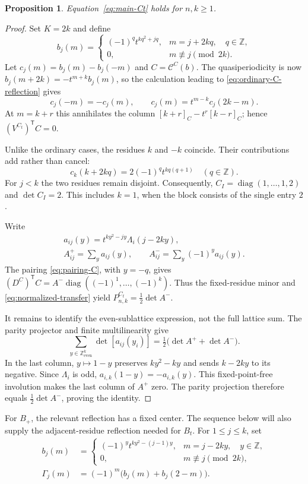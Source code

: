 \documentclass[12pt]{article}
\newtheorem{proposition}[theorem]{Proposition}
\numberwithin{equation}{section}
\newcommand{\Z}{\mathbb Z}
\newcommand{\diag}{\operatorname{diag}}
\newcommand{\latticeeven}{\Z_{\mathrm{even}}^k}
\begin{document}
\begin{proposition}
Equation~\eqref{eq:main-Ct} holds for $n,k\ge1$.
\end{proposition}

\begin{proof}
Set $K=2k$ and define
\[
 b_j(m)=
 \begin{cases}
 (-1)^q t^{kq^2+jq},&m=j+2kq,\quad q\in\Z,\\
 0,&m\not\equiv j\pmod{2k}.
 \end{cases}
\]
Let $c_j(m)=b_j(m)-b_j(-m)$ and $C=\mathcal C^C(b)$.
The quasiperiodicity is now
$b_j(m+2k)=-t^{m+k}b_j(m)$, so the calculation leading to
\eqref{eq:ordinary-C-reflection} gives
\[
 c_j(-m)=-c_j(m),\qquad
 c_j(m)=t^{m-k}c_j(2k-m).
\]
At $m=k+r$ this annihilates the column
$[k+r]_C-t^r[k-r]_C$; hence $(V^{C_t})^{\mathsf T}C=0$.

Unlike the ordinary cases, the residues $k$ and $-k$ coincide.
Their contributions add rather than cancel:
\[
 c_k(k+2kq)=2(-1)^qt^{kq(q+1)}\quad(q\in\Z).
\]
For $j<k$ the two residues remain disjoint.  Consequently,
$C_I=\diag(1,\ldots,1,2)$ and $\det C_I=2$.
This includes $k=1$, when the block consists of the single entry $2$.

Write
\[
\begin{gathered}
 a_{ij}(y)=t^{ky^2-jy}\Lambda_i(j-2ky),\\
 A^+_{ij}=\sum_y a_{ij}(y),\qquad
 A^-_{ij}=\sum_y(-1)^y a_{ij}(y).
\end{gathered}
\]
The pairing \eqref{eq:pairing-C}, with $y=-q$, gives
$(D^C)^{\mathsf T}C=A^-\diag((-1)^1,\ldots,(-1)^k)$.
Thus the fixed-residue minor and \eqref{eq:normalized-transfer} yield
$P^{C_t}_{n,k}=\tfrac12\det A^-$.

It remains to identify the even-sublattice expression, not the full
lattice sum.  The parity projector and finite multilinearity give
\[
 \sum_{y\in\latticeeven}\det[a_{ij}(y_i)]
 =\tfrac12\bigl(\det A^++\det A^-\bigr).
\]
In the last column, $y\mapsto1-y$ preserves $ky^2-ky$ and sends
$k-2ky$ to its negative.  Since $\Lambda_i$ is odd,
$a_{i,k}(1-y)=-a_{i,k}(y)$.  This fixed-point-free involution makes
the last column of $A^+$ zero.  The parity projection therefore equals
$\tfrac12\det A^-$, proving the identity.
\end{proof}

For $B_+$, the relevant reflection has a fixed center.
The sequence below will also supply the adjacent-residue
reflection needed for $B_t$.  For $1\le j\le k$, set
\begin{equation}\label{eq:Bplus-sequence}
\begin{aligned}
 b_j(m)&=
 \begin{cases}
 (-1)^y t^{ky^2-(j-1)y},&m=j-2ky,\quad y\in\Z,\\
 0,&m\not\equiv j\pmod{2k},
 \end{cases}\\
 \Gamma_j(m)&=(-1)^m\bigl(b_j(m)+b_j(2-m)\bigr).
\end{aligned}
\end{equation}
\end{document}
